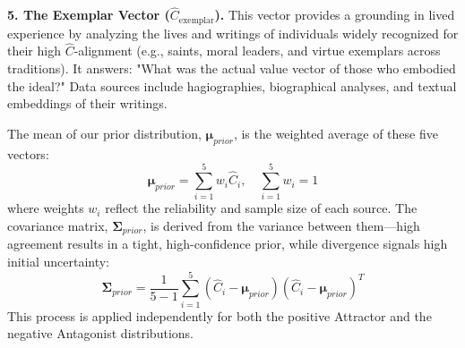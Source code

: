 \documentclass[11pt,a4paper]{article}
\theoremstyle{definition}
\theoremstyle{remark}
\begin{document}
\begin{small}
\textbf{5. The Exemplar Vector (\(\hat{C}_{\text{exemplar}}\)).} This vector provides a grounding in lived experience by analyzing the lives and writings of individuals widely recognized for their high \(\hat{C}\)-alignment (e.g., saints, moral leaders, and virtue exemplars across traditions). It answers: "What was the actual value vector of those who embodied the ideal?" Data sources include hagiographies, biographical analyses, and textual embeddings of their writings.

The mean of our prior distribution, \(\boldsymbol{\mu}_{prior}\), is the weighted average of these five vectors:
\begin{equation}
\boldsymbol{\mu}_{prior} = \sum_{i=1}^{5} w_i \hat{C}_i, \quad \sum_{i=1}^{5} w_i = 1
\end{equation}
where weights \(w_i\) reflect the reliability and sample size of each source. The covariance matrix, \(\boldsymbol{\Sigma}_{prior}\), is derived from the variance between them—high agreement results in a tight, high-confidence prior, while divergence signals high initial uncertainty:
\begin{equation}
\boldsymbol{\Sigma}_{prior} = \frac{1}{5-1} \sum_{i=1}^{5} (\hat{C}_i - \boldsymbol{\mu}_{prior})(\hat{C}_i - \boldsymbol{\mu}_{prior})^T
\end{equation}
This process is applied independently for both the positive Attractor and the negative Antagonist distributions.

\begin{figure}[h!]
    \centering
\end{figure}
\end{small}
\end{document}
